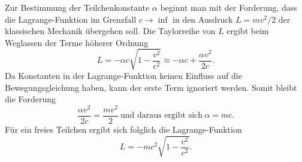 Zur Bestimmung der Teilchenkonstante \(\alpha\) beginnt man mit der Forderung,
dass die Lagrange-Funktion im Grenzfall \(c\rightarrow\inf\) in den
Ausdruck \(L=mv^2/2\) der klassischen Mechanik übergehen soll.
Die Taylorreihe von \(L\) ergibt beim Weglassen der Terme höherer Ordnung
\begin{equation}
    L = - \alpha c \sqrt{1-\frac{v^2}{c^2}}
    \approx -\alpha c + \frac{\alpha v^2}{2c}.
\end{equation}
Da Konstanten in der Lagrange-Funktion keinen Einfluss auf die Bewegungsgleichung haben,
kann der erste Term ignoriert werden. Somit bleibt die Forderung
\begin{equation}
    \frac{\alpha v^2}{2c} = \frac{mv^2}{2}\
    \text{und daraus ergibt sich}\
    \alpha = mc.
\end{equation}
Für ein freies Teilchen ergibt sich folglich die Lagrange-Funktion
\begin{equation}
    L = -mc^2 \sqrt{1-\frac{v^2}{c^2}}.
\label{relativ:eqn:lagrange-freies-teilchen}
\end{equation}
